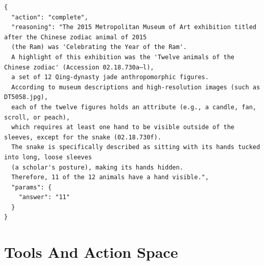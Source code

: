 \begin{tcolorbox}[
  title={\textbf{\small Attempt 10 - Main Decision (Final)}},
  boxrule=1pt,
  arc=0mm,
  colback=black!5,
  colframe=black!70,
  breakable,
  before skip=10pt,
  after skip=10pt,
  pad at break=2mm,
  parbox=false
]
\begin{verbatim}
{
  "action": "complete",
  "reasoning": "The 2015 Metropolitan Museum of Art exhibition titled after the Chinese zodiac animal of 2015 
  (the Ram) was 'Celebrating the Year of the Ram'. 
  A highlight of this exhibition was the 'Twelve animals of the Chinese zodiac' (Accession 02.18.730a–l),
  a set of 12 Qing-dynasty jade anthropomorphic figures. 
  According to museum descriptions and high-resolution images (such as DT5058.jpg),
  each of the twelve figures holds an attribute (e.g., a candle, fan, scroll, or peach), 
  which requires at least one hand to be visible outside of the sleeves, except for the snake (02.18.730f). 
  The snake is specifically described as sitting with its hands tucked into long, loose sleeves 
  (a scholar's posture), making its hands hidden. 
  Therefore, 11 of the 12 animals have a hand visible.",
  "params": {
    "answer": "11"
  }
}
\end{verbatim}
\end{tcolorbox}











\section{Tools And Action Space}
\label{app:action_space}

